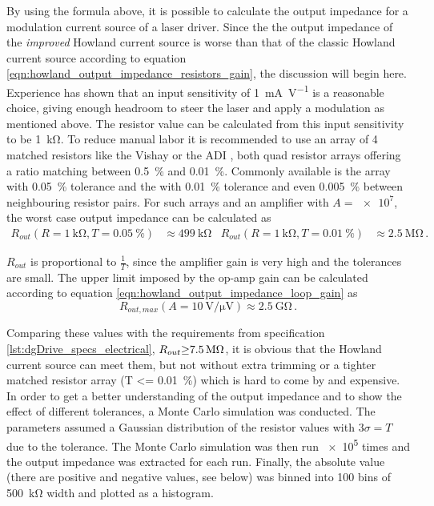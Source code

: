 By using the formula above, it is possible to calculate the output impedance for a modulation current source of a laser driver. Since the the output impedance of the \textit{improved} Howland current source is worse than that of the classic Howland current source according to equation \ref{eqn:howland_output_impedance_resistors_gain}, the discussion will begin here. Experience has shown that an input sensitivity of \qty{1}{\mA \per \V} is a reasonable choice, giving enough headroom to steer the laser and apply a modulation as mentioned above. The resistor value can be calculated from this input sensitivity to be \qty{1}{\kilo\ohm}. To reduce manual labor it is recommended to use an array of \num{4} matched resistors like the Vishay  \cite{datasheet_MORN} or the ADI  \cite{datasheet_LT5400}, both quad resistor arrays offering a ratio matching between \qty{0.5}{\percent} and \qty{0.01}{\percent}. Commonly available is the  array with \qty{0.05}{\percent} tolerance and the  with \qty{0.01}{\percent} tolerance and even \qty{0.005}{\percent} between neighbouring resistor pairs. For such arrays and an amplifier with $A=\num{e7}$, the worst case output impedance can be calculated as
\begin{align*}
    R_{out}(R=\qty{1}{\kilo\ohm}, T=\qty{0.05}{\percent}) &\approx \qty{499}{\kilo\ohm} & R_{out}(R=\qty{1}{\kilo\ohm}, T=\qty{0.01}{\percent}) &\approx \qty{2.5}{\mega\ohm} \,.
\end{align*}

$R_{out}$ is proportional to $\frac{1}{T}$, since the amplifier gain is very high and the tolerances are small. The upper limit imposed by the op-amp gain can be calculated according to equation \ref{eqn:howland_output_impedance_loop_gain} as
\begin{equation*}
    R_{out, max} (A=\qty{10}{\V \per \uV}) \approx \qty{2.5}{\giga\ohm}\,.
\end{equation*}

Comparing these values with the requirements from specification \ref{lst:dgDrive_specs_electrical}, $R_{out} \qty{\geq 7.5}{\mega \ohm}$, it is obvious that the Howland current source can meet them, but not without extra trimming or a tighter matched resistor array (T \qty{<= 0.01}{\percent}) which is hard to come by and expensive. In order to get a better understanding of the output impedance and to show the effect of different tolerances, a Monte Carlo simulation was conducted. The parameters assumed a Gaussian distribution of the resistor values with $3 \sigma = T$ due to the tolerance. The Monte Carlo simulation was then run \num{e5} times and the output impedance was extracted for each run. Finally, the absolute value (there are positive and negative values, see below) was binned into \num{100} bins of \qty{500}{\kilo\ohm} width and plotted as a histogram.

